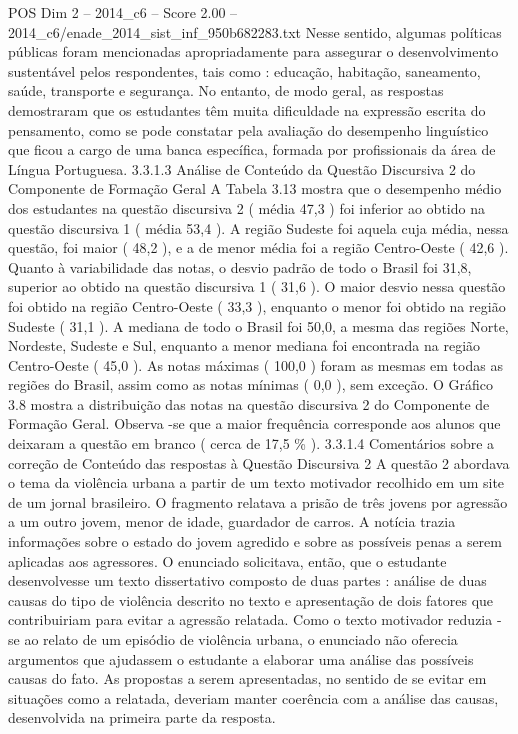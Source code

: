 \begin{textsample}{POS Dim 2 – 2014\_c6 – Score 2.00 – 2014\_c6/enade\_2014\_sist\_inf\_950b682283.txt}
Nesse sentido, algumas políticas públicas foram mencionadas apropriadamente para assegurar o desenvolvimento sustentável pelos respondentes, tais como : educação, habitação, saneamento, saúde, transporte e segurança.
No entanto, de modo geral, as respostas demostraram que os estudantes têm muita dificuldade na expressão escrita do pensamento, como se pode constatar pela avaliação do desempenho linguístico que ficou a cargo de uma banca específica, formada por profissionais da área de Língua Portuguesa. 3.3.1.3 Análise de Conteúdo da Questão Discursiva 2 do Componente de Formação Geral A Tabela 3.13 mostra que o desempenho médio dos estudantes na questão discursiva 2 ( média 47,3 ) foi inferior ao obtido na questão discursiva 1 ( média 53,4 ).
A região Sudeste foi aquela cuja média, nessa questão, foi maior ( 48,2 ), e a de menor média foi a região Centro-Oeste ( 42,6 ).
Quanto à variabilidade das notas, o desvio padrão de todo o Brasil foi 31,8, superior ao obtido na questão discursiva 1 ( 31,6 ).
O maior desvio nessa questão foi obtido na região Centro-Oeste ( 33,3 ), enquanto o menor foi obtido na região Sudeste ( 31,1 ).
A mediana de todo o Brasil foi 50,0, a mesma das regiões Norte, Nordeste, Sudeste e Sul, enquanto a menor mediana foi encontrada na região Centro-Oeste ( 45,0 ).
As notas máximas ( 100,0 ) foram as mesmas em todas as regiões do Brasil, assim como as notas mínimas ( 0,0 ), sem exceção.
O Gráfico 3.8 mostra a distribuição das notas na questão discursiva 2 do Componente de Formação Geral.
Observa -se que a maior frequência corresponde aos alunos que deixaram a questão em branco ( cerca de 17,5 \% ). 3.3.1.4 Comentários sobre a correção de Conteúdo das respostas à Questão Discursiva 2 A questão 2 abordava o tema da violência urbana a partir de um texto motivador recolhido em um site de um jornal brasileiro.
O fragmento relatava a prisão de três jovens por agressão a um outro jovem, menor de idade, guardador de carros.
A notícia trazia informações sobre o estado do jovem agredido e sobre as possíveis penas a serem aplicadas aos agressores.
O enunciado solicitava, então, que o estudante desenvolvesse um texto dissertativo composto de duas partes : análise de duas causas do tipo de violência descrito no texto e apresentação de dois fatores que contribuiriam para evitar a agressão relatada.
Como o texto motivador reduzia -se ao relato de um episódio de violência urbana, o enunciado não oferecia argumentos que ajudassem o estudante a elaborar uma análise das possíveis causas do fato.
As propostas a serem apresentadas, no sentido de se evitar em situações como a relatada, deveriam manter coerência com a análise das causas, desenvolvida na primeira parte da resposta.

\end{textsample}
